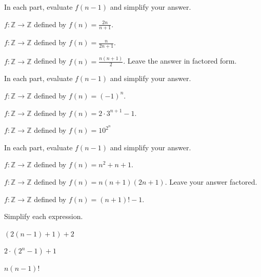  \begin{exer}[\exerP] %
\label{exer_eval_fofnminus1_linears}
    In each part, evaluate $f(n-1)$ and simplify your answer.
        \begin{exerpart}
            \item $f: \mathbb{Z} \to \mathbb{Z}$ defined by $\displaystyle f(n)=\frac{2n}{n+1}$.
            \item $f: \mathbb{Z} \to \mathbb{Z}$ defined by $\displaystyle f(n)=\frac{n}{2n+1}$.
            \item $f: \mathbb{Z} \to \mathbb{Z}$ defined by $\displaystyle f(n)=\frac{n(n+1)}{2}$. Leave the answer in factored form.
        \end{exerpart}
\end{exer}

\begin{exer}[\exerP] %
\label{exer_eval_fofnminus1_exponentials}
    In each part, evaluate $f(n-1)$ and simplify your answer.
        \begin{exerpart}
            \item $f: \mathbb{Z} \to \mathbb{Z}$ defined by $f(n)=(-1)^n$.
            \item $f: \mathbb{Z} \to \mathbb{Z}$ defined by $f(n)=2\cdot3^{n+1}-1$.
            \item $f: \mathbb{Z} \to \mathbb{Z}$ defined by $f(n) =10^{2^n}$
        \end{exerpart}
\end{exer}

\begin{exer}[\exerP] %
\label{exer_eval_fofnminus1_exponentials}
    In each part, evaluate $f(n-1)$ and simplify your answer.
        \begin{exerpart}
            \item $f: \mathbb{Z} \to \mathbb{Z}$ defined by $f(n)=n^2+n+1$.
            \item $f: \mathbb{Z} \to \mathbb{Z}$ defined by $f(n)=n(n+1)(2n+1)$.  Leave your answer factored.
            \item $f: \mathbb{Z} \to \mathbb{Z}$ defined by $f(n)=(n+1)!-1$.
        \end{exerpart}
\end{exer}

\begin{exer}[\exerU] %
\label{exer_simplify_ind_alg}
    Simplify each expression.
        \begin{exerpart}
            \item $(2(n-1)+1)+2$
            \item $2\cdot (2^n-1)+1$
            \item $n(n-1)!$
        \end{exerpart} 
\end{exer}

